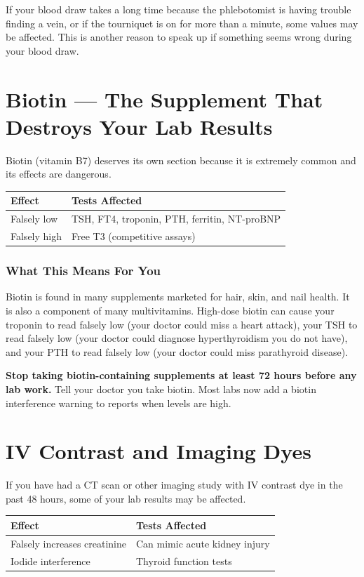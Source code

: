 If your blood draw takes a long time because the phlebotomist is having trouble finding a vein, or if the tourniquet is on for more than a minute, some values may be affected. This is another reason to speak up if something seems wrong during your blood draw.

\clearpage
\section{Biotin --- The Supplement That Destroys Your Lab Results}

Biotin (vitamin B7) deserves its own section because it is extremely common and its effects are dangerous.

\begin{longtable}{@{}p{4.5cm}p{10.5cm}@{}}
\toprule
\textbf{Effect} & \textbf{Tests Affected} \\
\midrule
Falsely low & TSH, FT4, troponin, PTH, ferritin, NT-proBNP \\
Falsely high & Free T3 (competitive assays) \\
\bottomrule
\end{longtable}

\subsubsection{What This Means For You}

Biotin is found in many supplements marketed for hair, skin, and nail health. It is also a component of many multivitamins. High-dose biotin can cause your troponin to read falsely low (your doctor could miss a heart attack), your TSH to read falsely low (your doctor could diagnose hyperthyroidism you do not have), and your PTH to read falsely low (your doctor could miss parathyroid disease).

\textbf{Stop taking biotin-containing supplements at least 72 hours before any lab work.} Tell your doctor you take biotin. Most labs now add a biotin interference warning to reports when levels are high.

\clearpage
\section{IV Contrast and Imaging Dyes}

If you have had a CT scan or other imaging study with IV contrast dye in the past 48 hours, some of your lab results may be affected.

\begin{longtable}{@{}p{4.5cm}p{10.5cm}@{}}
\toprule
\textbf{Effect} & \textbf{Tests Affected} \\
\midrule
Falsely increases creatinine & Can mimic acute kidney injury \\
Iodide interference & Thyroid function tests \\
\bottomrule
\end{longtable}

